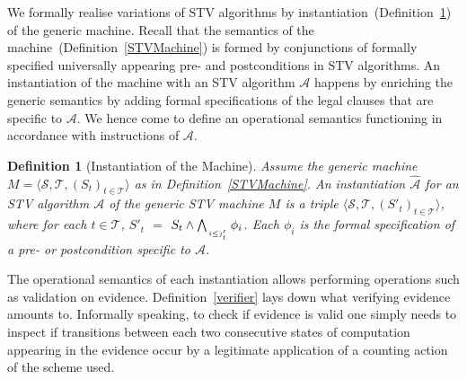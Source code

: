 \documentclass[10pt,conference]{IEEEtran}
\newtheorem{definition}{Definition}
\begin{document}
We formally realise variations of STV algorithms by instantiation~(Definition~\ref{STVInst}) of the generic machine. Recall that the semantics of the machine~(Definition~\ref{STVMachine}) is formed by conjunctions of formally specified universally appearing pre- and postconditions in STV algorithms. An instantiation of the machine with an STV algorithm $\mathcal{A}$ happens by enriching the generic semantics by adding formal specifications of the legal clauses that are specific to $\mathcal{A}$. We hence come to define an operational semantics functioning in accordance with instructions of $\mathcal{A}$. 
\begin{definition}[Instantiation of the Machine]\label{STVInst}
Assume the generic machine $M = \langle \mathcal{S}, \mathcal{T}, (S_t)_{t \in \mathcal{T}} \rangle$ as in Definition~\ref{STVMachine}. An instantiation $\hat{\mathcal{A}}$ for an STV algorithm $\mathcal{A}$ of  the generic STV machine $M$ is a triple $\langle \mathcal{S}, \mathcal{T}, (S'_t)_{t \in \mathcal{T}} \rangle$, where for each $t\in\mathcal{T}$, $S'_{t}$ $=$ $S_{t}\wedge\bigwedge_{\atop{i\leq j'_{t}}} \phi_{i}$. Each $\phi_{i}$ is the formal specification of a pre- or postcondition specific to $\mathcal{A}$.   
\end{definition}

The operational semantics of each instantiation allows performing operations such as validation on evidence. Definition~\ref{verifier} lays down what verifying evidence amounts to. Informally speaking, to check if evidence is valid one simply needs to inspect if transitions between each two consecutive states of computation appearing in the evidence occur by a legitimate application of a counting action of the scheme used.
\end{document}

